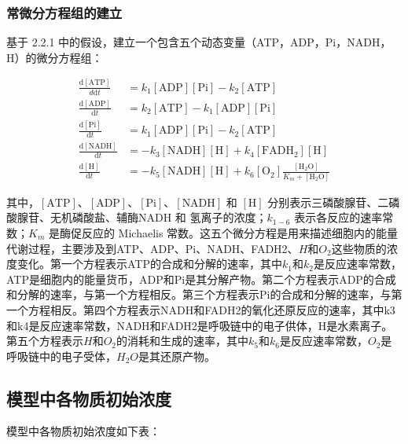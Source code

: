 \documentclass{ctexart}
\begin{document}
\subsubsection{常微分方程组的建立}

基于 2.2.1 中的假设，建立一个包含五个动态变量（ATP，ADP，Pi，NADH，H）的微分方程组：

$$
    \begin{aligned}
        \frac{\mathrm{d}[\text{ATP}]}{d\mathrm{d}t} & = k_{1}[\text{ADP}] [\text{Pi}] - k_2 [\text{ATP}]                                                             \\
        \frac{\mathrm{d}[\text{ADP}]}{\mathrm{d}t}  & = k_{2} [\text{ATP}] - k_{1} [\text{ADP}] [\text{Pi}]                                                          \\
        \frac{\mathrm{d}[\text{Pi}]}{\mathrm{d}t}   & = k_{1} [\text{ADP}] [\text{Pi}] - k_{2} [\text{ATP}]                                                          \\
        \frac{\mathrm{d}[\text{NADH}]}{\mathrm{d}t} & = -k_{3} [\text{NADH}] [\text{H}] + k_{4} [\text{FADH}_2] [\text{H}]                                           \\
        \frac{\mathrm{d}[\text{H}]}{\mathrm{d}t}    & = -k_{5} [\text{NADH}] [\text{H}] + k_{6} [\text{O}_2]\frac{ [\text{H}_2\text{O}]}{K_m + [\text{H}_2\text{O}]}
    \end{aligned}
$$

其中，$[\text{ATP}]$、$[\text{ADP}]$、$[\text{Pi}]$、$[\text{NADH}]$ 和 $[\text{H}]$ 分别表示三磷酸腺苷、二磷酸腺苷、无机磷酸盐、辅酶NADH 和 氢离子的浓度；$k_{1-6}$ 表示各反应的速率常数；$K_m$ 是酶促反应的 Michaelis 常数。这五个微分方程是用来描述细胞内的能量代谢过程，主要涉及到ATP、ADP、Pi、NADH、FADH2、$H$和$O_2$这些物质的浓度变化。第一个方程表示ATP的合成和分解的速率，其中$k_1$和$k_2$是反应速率常数，ATP是细胞内的能量货币，ADP和Pi是其分解产物。第二个方程表示ADP的合成和分解的速率，与第一个方程相反。第三个方程表示Pi的合成和分解的速率，与第一个方程相反。第四个方程表示NADH和FADH2的氧化还原反应的速率，其中k3和k4是反应速率常数，NADH和FADH2是呼吸链中的电子供体，H是水素离子。第五个方程表示$H$和$O_2$的消耗和生成的速率，其中$k_5$和$k_6$是反应速率常数，$O_2$是呼吸链中的电子受体，$H_2O$是其还原产物。


\subsection{模型中各物质初始浓度}
模型中各物质初始浓度如下表：
\end{document}
